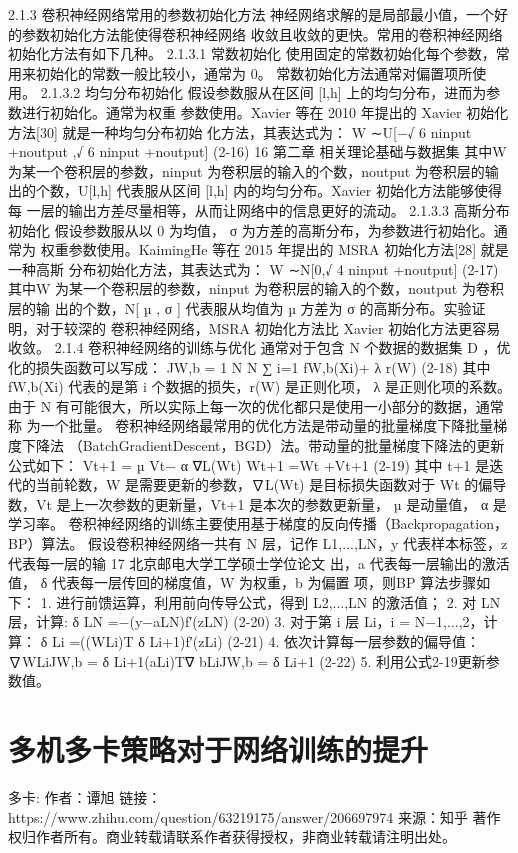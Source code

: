 2.1.3 卷积神经网络常用的参数初始化方法
神经网络求解的是局部最小值，一个好的参数初始化方法能使得卷积神经网络 收敛且收敛的更快。常用的卷积神经网络初始化方法有如下几种。
2.1.3.1 常数初始化
使用固定的常数初始化每个参数，常用来初始化的常数一般比较小，通常为 0。 常数初始化方法通常对偏置项所使用。
2.1.3.2 均匀分布初始化
假设参数服从在区间 [l,h] 上的均匀分布，进而为参数进行初始化。通常为权重 参数使用。Xavier 等在 2010 年提出的 Xavier 初始化方法[30] 就是一种均匀分布初始 化方法，其表达式为： W ∼U[−√ 6 ninput +noutput ,√ 6 ninput +noutput] (2-16)
16
第二章 相关理论基础与数据集
其中W 为某一个卷积层的参数，ninput 为卷积层的输入的个数，noutput 为卷积层的输 出的个数，U[l,h] 代表服从区间 [l,h] 内的均匀分布。Xavier 初始化方法能够使得每 一层的输出方差尽量相等，从而让网络中的信息更好的流动。
2.1.3.3 高斯分布初始化
假设参数服从以 0 为均值， σ
为方差的高斯分布，为参数进行初始化。通常为 权重参数使用。KaimingHe 等在 2015 年提出的 MSRA 初始化方法[28] 就是一种高斯 分布初始化方法，其表达式为： W ∼N[0,√ 4 ninput +noutput] (2-17) 其中W 为某一个卷积层的参数，ninput 为卷积层的输入的个数，noutput 为卷积层的输 出的个数，N[ µ , σ ] 代表服从均值为 µ 方差为 σ 的高斯分布。实验证明，对于较深的 卷积神经网络，MSRA 初始化方法比 Xavier 初始化方法更容易收敛。
2.1.4 卷积神经网络的训练与优化 通常对于包含 N 个数据的数据集 D ，优化的损失函数可以写成：
JW,b =
1 N
N ∑ i=1
fW,b(Xi)+
λ r(W) (2-18)
其中 fW,b(Xi) 代表的是第 i 个数据的损失，r(W) 是正则化项， λ
是正则化项的系数。 由于 N 有可能很大，所以实际上每一次的优化都只是使用一小部分的数据，通常称 为一个批量。 卷积神经网络最常用的优化方法是带动量的批量梯度下降批量梯度下降法 （BatchGradientDescent，BGD）法。带动量的批量梯度下降法的更新公式如下： Vt+1 = µ Vt− α ∇L(Wt) Wt+1 =Wt +Vt+1 (2-19) 其中 t+1 是迭代的当前轮数，W 是需要更新的参数，∇L(Wt) 是目标损失函数对于 Wt 的偏导数，Vt 是上一次参数的更新量，Vt+1 是本次的参数更新量， µ 是动量值， α 是学习率。 卷积神经网络的训练主要使用基于梯度的反向传播（Backpropagation，BP）算法。 假设卷积神经网络一共有 N 层，记作 L1,...,LN，y 代表样本标签，z 代表每一层的输
17
北京邮电大学工学硕士学位论文
出，a 代表每一层输出的激活值， δ
代表每一层传回的梯度值，W 为权重，b 为偏置
项，则BP 算法步骤如下：
1. 进行前馈运算，利用前向传导公式，得到 L2,...,LN 的激活值；
2. 对 LN 层，计算:
δ LN =−(y−aLN)f′(zLN) (2-20) 3. 对于第 i 层 Li，i = N−1,...,2，计算： δ Li =((WLi)T δ Li+1)f′(zLi) (2-21) 4. 依次计算每一层参数的偏导值： ∇WLiJW,b = δ Li+1(aLi)T∇ bLiJW,b = δ Li+1 (2-22)
5. 利用公式2-19更新参数值。



\section{多机多卡策略对于网络训练的提升}
多卡:
作者：谭旭
链接：https://www.zhihu.com/question/63219175/answer/206697974
来源：知乎
著作权归作者所有。商业转载请联系作者获得授权，非商业转载请注明出处。

